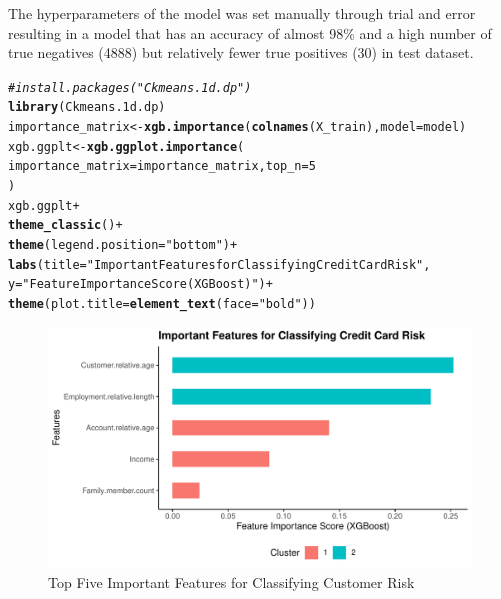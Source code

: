 \documentclass{article}\usepackage[]{graphicx}\usepackage[]{xcolor}
\makeatletter
\def\maxwidth{ %
  \ifdim\Gin@nat@width>\linewidth
    \linewidth
  \else
    \Gin@nat@width
  \fi
}
\newcommand{\hlnum}[1]{\textcolor[rgb]{0.686,0.059,0.569}{#1}}%
\newcommand{\hlsng}[1]{\textcolor[rgb]{0.192,0.494,0.8}{#1}}%
\newcommand{\hlcom}[1]{\textcolor[rgb]{0.678,0.584,0.686}{\textit{#1}}}%
\newcommand{\hlopt}[1]{\textcolor[rgb]{0,0,0}{#1}}%
\newcommand{\hldef}[1]{\textcolor[rgb]{0.345,0.345,0.345}{#1}}%
\newcommand{\hlkwb}[1]{\textcolor[rgb]{0.69,0.353,0.396}{#1}}%
\newcommand{\hlkwc}[1]{\textcolor[rgb]{0.333,0.667,0.333}{#1}}%
\newcommand{\hlkwd}[1]{\textcolor[rgb]{0.737,0.353,0.396}{\textbf{#1}}}%
\newenvironment{kframe}{%
 \def\at@end@of@kframe{}%
 \ifinner\ifhmode%
  \def\at@end@of@kframe{\end{minipage}}%
  \begin{minipage}{\columnwidth}%
 \fi\fi%
 \def\FrameCommand##1{\hskip\@totalleftmargin \hskip-\fboxsep
 \colorbox{shadecolor}{##1}\hskip-\fboxsep
     \hskip-\linewidth \hskip-\@totalleftmargin \hskip\columnwidth}%
 \MakeFramed {\advance\hsize-\width
   \@totalleftmargin\z@ \linewidth\hsize
   \@setminipage}}%
 {\par\unskip\endMakeFramed%
 \at@end@of@kframe}
\newenvironment{knitrout}{}{} %
\makeatother
\begin{document}
The hyperparameters of the model was set manually through trial and error resulting in a model that has an accuracy of almost 98\% and a high number of true negatives (4888) but relatively fewer true positives (30) in test dataset. \\

\begin{knitrout}
\color{fgcolor}\begin{kframe}
\begin{alltt}
\hlcom{# install.packages("Ckmeans.1d.dp")}
\hlkwd{library}\hldef{(Ckmeans.1d.dp)}
\hldef{importance_matrix} \hlkwb{<-} \hlkwd{xgb.importance}\hldef{(}\hlkwd{colnames}\hldef{(X_train),} \hlkwc{model} \hldef{= model)}
\hldef{xgb.ggplt} \hlkwb{<-} \hlkwd{xgb.ggplot.importance}\hldef{(}
  \hlkwc{importance_matrix} \hldef{= importance_matrix,} \hlkwc{top_n} \hldef{=} \hlnum{5}
\hldef{)}
\hldef{xgb.ggplt} \hlopt{+}
  \hlkwd{theme_classic}\hldef{()} \hlopt{+}
  \hlkwd{theme}\hldef{(}\hlkwc{legend.position} \hldef{=} \hlsng{"bottom"}\hldef{)} \hlopt{+}
  \hlkwd{labs}\hldef{(}\hlkwc{title} \hldef{=} \hlsng{"Important Features for Classifying Credit Card Risk"}\hldef{,}
       \hlkwc{y} \hldef{=} \hlsng{"Feature Importance Score (XGBoost)"}\hldef{)} \hlopt{+}
  \hlkwd{theme}\hldef{(}\hlkwc{plot.title} \hldef{=} \hlkwd{element_text}\hldef{(}\hlkwc{face} \hldef{=} \hlsng{"bold"}\hldef{))}
\end{alltt}
\end{kframe}\begin{figure}[H]
\includegraphics[width=\maxwidth]{figure/unnamed-chunk-43-1} \caption[Top Five Important Features for Classifying Customer Risk]{Top Five Important Features for Classifying Customer Risk}\label{fig:unnamed-chunk-43}
\end{figure}

\end{knitrout}
\end{document}

